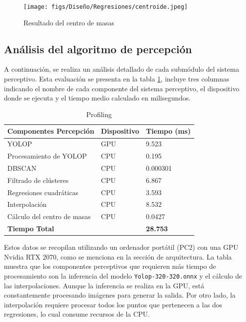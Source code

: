   \begin{figure} [H]
    \begin{center}
      \texttt{[image: figs/Diseño/Regresiones/centroide.jpeg]}
    \end{center}
    \caption{Resultado del centro de masas}
    \label{fig:centro de masas}
    \vspace{-1.5em}
  \end{figure}

  \subsection{Análisis del algoritmo de percepción}
  \label{sec:Análisis del algoritmo de percepción}
  A continuación, se realiza un análisis detallado de cada submódulo del sistema perceptivo. Esta evaluación se presenta en la tabla \ref{tab:Profiling}, incluye 
  tres columnas indicando el nombre  de cada componente del sistema perceptivo, el dispositivo donde se ejecuta y el tiempo medio calculado en milisegundos.

\begin{table}[h]
    \centering
    \begin{tabular}{| m{5cm} | m{3cm} | m{3cm} |}
        \hline
        \textbf{Componentes Percepción} & \textbf{Dispositivo} & \textbf{Tiempo (ms)} \\ \hline
        YOLOP & GPU & 9.523 \\ \hline
        Procesamiento de YOLOP & CPU & 0.195 \\ \hline
        DBSCAN & CPU & 0.000301 \\ \hline
        Filtrado de clústeres & CPU & 6.867 \\ \hline
        Regresiones cuadráticas & CPU & 3.593 \\ \hline
        Interpolación & CPU & 8.532 \\ \hline
        Cálculo del centro de masas & CPU & 0.0427 \\ \hline
        \textbf{Tiempo Total} & & \textbf{28.753} \\ \hline
    \end{tabular}
    \caption{Profiling}
    \label{tab:Profiling}
\end{table}

Estos datos se recopilan utilizando un ordenador portátil (PC2) con una GPU Nvidia RTX 2070, como se menciona en la sección de arquitectura. La tabla muestra que los 
componentes perceptivos que requieren más tiempo de procesamiento son la inferencia del modelo \texttt{Yolop-320-320.onnx} y el cálculo de las interpolaciones. 
Aunque la inferencia se realiza en la GPU, está constantemente procesando imágenes para generar la salida. Por otro lado, la interpolación 
requiere procesar todos los puntos que pertenecen a las dos regresiones, lo cual consume recursos de la CPU.


